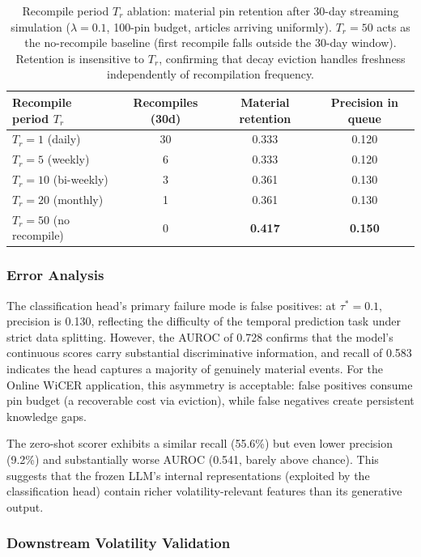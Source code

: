 \documentclass{article}
\begin{document}
\begin{table}[t]
\centering
\caption{Recompile period $T_r$ ablation: material pin retention after 30-day streaming simulation ($\lambda = 0.1$, 100-pin budget, articles arriving uniformly). $T_r = 50$ acts as the no-recompile baseline (first recompile falls outside the 30-day window). Retention is insensitive to $T_r$, confirming that decay eviction handles freshness independently of recompilation frequency.}
\label{tab:recompile}
\small
\begin{tabular}{@{}lccc@{}}
\toprule
\textbf{Recompile period $T_r$} & \textbf{Recompiles (30d)} & \textbf{Material retention} & \textbf{Precision in queue} \\
\midrule
$T_r = 1$  (daily)      & 30 & 0.333 & 0.120 \\
$T_r = 5$  (weekly)     &  6 & 0.333 & 0.120 \\
$T_r = 10$ (bi-weekly)  &  3 & 0.361 & 0.130 \\
$T_r = 20$ (monthly)    &  1 & 0.361 & 0.130 \\
$T_r = 50$ (no recompile) & 0 & \textbf{0.417} & \textbf{0.150} \\
\bottomrule
\end{tabular}
\end{table}

\subsubsection{Error Analysis}

The classification head's primary failure mode is false positives: at $\tau^* = 0.1$, precision is 0.130, reflecting the difficulty of the temporal prediction task under strict data splitting.
However, the AUROC of 0.728 confirms that the model's continuous scores carry substantial discriminative information, and recall of 0.583 indicates the head captures a majority of genuinely material events.
For the Online WiCER application, this asymmetry is acceptable: false positives consume pin budget (a recoverable cost via eviction), while false negatives create persistent knowledge gaps.

The zero-shot scorer exhibits a similar recall (55.6\%) but even lower precision (9.2\%) and substantially worse AUROC (0.541, barely above chance).
This suggests that the frozen LLM's internal representations (exploited by the classification head) contain richer volatility-relevant features than its generative output.

\subsubsection{Downstream Volatility Validation}
\end{document}
